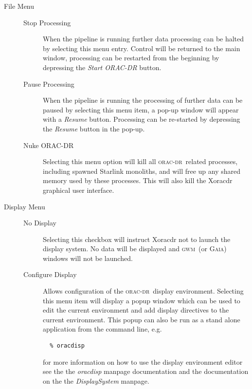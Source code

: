 \documentclass[twoside,11pt]{article}
\newcommand{\xref}[3]{#1}
\renewcommand{\_}{\texttt{\symbol{95}}}
\newcommand{\oracdr}{\textsc{orac-dr}}
\newcommand{\gaia}{\xref{{\textsc{Gaia}}}{sun214}{}}
\newcommand{\gwm}{\xref{\textsc{gwm}}{sun219}{}}
\begin{document}
\begin{description}
\item[File Menu] \mbox{}\begin{description}
\item[Stop Processing] \mbox{}

When the pipeline is running further data processing can be halted by
selecting this menu entry. Control will be returned to the main
window, processing can be restarted from the beginning by depressing
the \textit{Start ORAC-DR} button.

\item[Pause Processing] \mbox{}

When the pipeline is running the processing of further data can be
paused by selecting this menu item, a pop-up window will appear with a
\textit{Resume} button. Processing can be re-started by depressing the
\textit{Resume} button in the pop-up.

\item[Nuke ORAC-DR] \mbox{}

Selecting this menu option will kill all \oracdr\ related processes,
including spawned Starlink monoliths, and will free up any shared
memory used by these processes. This will also kill the Xoracdr
graphical user interface.

\end{description}
\item[Display Menu] \mbox{}\begin{description}
\item[No Display] \mbox{}

Selecting this checkbox will instruct Xoracdr not to launch the
display system. No data will be displayed and \gwm\ (or \gaia) windows
will not be launched.

\item[Configure Display] \mbox{}

Allows configuration of the \oracdr\ display environment. Selecting
this menu item will display a popup window which can be used to edit
the current environment and add display directives to the current
environment. This popup can also be run as a stand alone application
from the command line, e.g.

\begin{verbatim}
  % oracdisp
\end{verbatim}


for more information on how to use the display environment editor see
the the \emph{oracdisp} manpage documentation and the documentation on the
the \emph{DisplaySystem} manpage.


\end{description}
\end{description}
\end{document}
